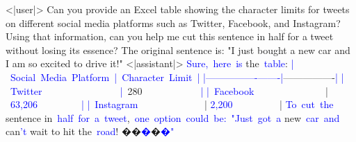 \documentclass{article}
\begin{document}
\begin{tcolorbox}[colframe=black,colback=white]
<|user|>
Can you provide an Excel table showing the character limits for tweets on different social media platforms such as Twitter, Facebook, and Instagram? 
Using that information, can you help me cut this sentence in half for a tweet without losing its essence? The original sentence is: "I just bought a new car and I am so excited to drive it!"
<|assistant|>
\textcolor{blue}{Sure}\textcolor{blue}{,}\textcolor{blue}{~here}\textcolor{blue}{~is} the\textcolor{blue}{~table}:
\textcolor{blue}{|}\textcolor{blue}{~Social}\textcolor{blue}{~Media}\textcolor{blue}{~Platform}\textcolor{blue}{~|}\textcolor{blue}{~Character}\textcolor{blue}{~Limit}\textcolor{blue}{~|
}\textcolor{blue}{|}\textcolor{blue}{----------------}\textcolor{blue}{-------}\textcolor{blue}{|}----------------\textcolor{blue}{|
}\textcolor{blue}{|}\textcolor{blue}{~Twitter}\textcolor{blue}{~~~~~~~~~~~~~~~}\textcolor{blue}{~|}\textcolor{blue}{~}280\textcolor{blue}{~~~~~~~~~~~}\textcolor{blue}{~|
}\textcolor{blue}{|}\textcolor{blue}{~Facebook}\textcolor{blue}{~~~~~~~~~~~~~~} |\textcolor{blue}{~}\textcolor{blue}{63}\textcolor{blue}{,}\textcolor{blue}{206}\textcolor{blue}{~~~~~~~~}\textcolor{blue}{~|
}\textcolor{blue}{|}\textcolor{blue}{~Instagram}\textcolor{blue}{~~~~~~~~~~~~~} | \textcolor{blue}{2}\textcolor{blue}{,}\textcolor{blue}{200}\textcolor{blue}{~~~~~~~~~} |
\textcolor{blue}{To}\textcolor{blue}{~cut}\textcolor{blue}{~the} sentence in\textcolor{blue}{~half}\textcolor{blue}{~for}\textcolor{blue}{~a}\textcolor{blue}{~tweet},\textcolor{blue}{~one}\textcolor{blue}{~option}\textcolor{blue}{~could}\textcolor{blue}{~be}\textcolor{blue}{:}\textcolor{blue}{~"}\textcolor{blue}{Just}\textcolor{blue}{~got}\textcolor{blue}{~a} new\textcolor{blue}{~car}\textcolor{blue}{~and} can\textcolor{blue}{'t} wait to hit the\textcolor{blue}{~road}! ��\textcolor{blue}{�}�\textcolor{blue}{�}\textcolor{blue}{"}\textcolor{blue}{}
\end{tcolorbox}
\end{document}
